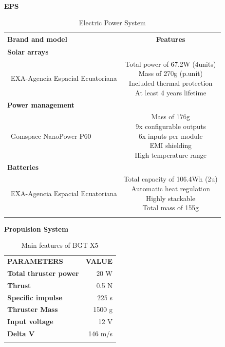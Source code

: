 \textbf{EPS}
\begin{longtable}{| l | c | }
	\hline
	\rowcolor[gray]{0.80}	\textbf{Brand and model} &  \textbf{Features}     \\
	\hline
	\endfirsthead
	
	\rowcolor[gray]{0.85} \textbf{Solar arrays} &  \\
	~EXA-Agencia Espacial Ecuatoriana & \makecell{Total power of 67.2W (4units)\\ Mass of 270g (p.unit) \\ Included thermal protection \\At least 4 years lifetime}  \\
	\hline
	\rowcolor[gray]{0.85} \textbf{Power management} &   \\
	~Gomspace NanoPower P60 & \makecell{Mass of 176g \\ 9x configurable outputs \\ 6x inputs per module \\ EMI shielding \\ High temperature range} \\
	\hline
	\rowcolor[gray]{0.85} \textbf{Batteries} &   \\
	~EXA-Agencia Espacial Ecuatoriana & \makecell{Total capacity of 106.4Wh (2u)\\ Automatic heat regulation \\ Highly stackable \\ Total mass of 155g} \\
	\hline
	
	\caption{Electric Power System}
	\label{epsoptions}
\end{longtable}
\clearpage
\textbf{Propulsion System}
\begin{longtable}{| l | r |}
	
	\hline
	
	\rowcolor[gray]{0.60} \multicolumn{2}{|c|}{\textbf{Thruster BGT-X5}} \\
	
	\hline
	
	\hline
	\rowcolor[gray]{0.75}	\textbf{PARAMETERS} &  \textbf{VALUE}   \\
	\hline
	
	\cellcolor[gray]{0.85} \textbf{Total thruster power} & 20 W  \\
	\cellcolor[gray]{0.85} \textbf{Thrust} & 0.5 N \\
	\cellcolor[gray]{0.85} \textbf{Specific impulse} & 225 s \\
	\cellcolor[gray]{0.85} \textbf{Thruster Mass} & 1500 g \\
	\cellcolor[gray]{0.85} \textbf{Input voltage} & 12 V \\
	\cellcolor[gray]{0.85} \textbf{Delta V} & 146 m/s \\
	\hline
	\caption{Main features of BGT-X5}
	\label{thrusterfinal}
\end{longtable}

